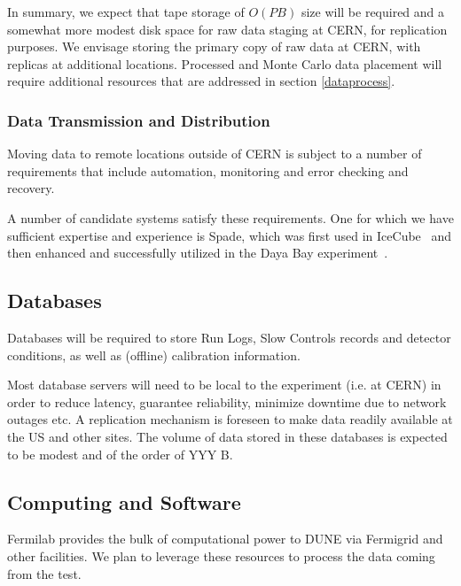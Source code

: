 In summary, we expect that tape storage of $O(PB)$ size will be required
and a somewhat more modest disk space for raw data staging at CERN, for replication purposes. 
We envisage storing the primary copy of raw data at CERN, with replicas at additional locations. 
%
Processed and Monte Carlo data placement will require additional resources that are addressed in section \ref{dataprocess}.


\subsubsection{Data Transmission and Distribution}
Moving data to remote locations outside of CERN is subject to a number of requirements that include
automation, monitoring and error checking and recovery. 

A number of candidate systems satisfy these requirements. One for which we have sufficient expertise and experience is Spade, which was first used in IceCube~\cite{spade_icecube} and then enhanced and successfully utilized in the Daya Bay experiment~\cite{spade_dayabay}.


\subsection{Databases}
Databases will be required to store Run Logs, Slow Controls records and detector conditions, as well as (offline) calibration information.

Most database servers will need to be local to the experiment (i.e. at CERN) in order to reduce latency, guarantee reliability, minimize
downtime due to network outages etc. A replication mechanism is foreseen to make data readily available at the US and other sites.
The volume of data stored in these databases is expected to be modest and of the order of YYY B.

\subsection{Computing and Software}


Fermilab provides the bulk of computational power to DUNE via Fermigrid and other facilities. 
We plan to leverage these resources to process the data coming from the test.

